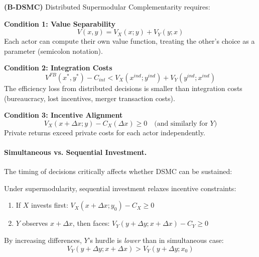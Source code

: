 \begin{axiom}
\label{ax:B-DSMC}
\textbf{(B-DSMC)} Distributed Supermodular Complementarity requires:

\textbf{Condition 1: Value Separability}
\begin{equation}
V(x, y) = V_X(x; y) + V_Y(y; x)
\label{eq:value-sep}
\end{equation}
Each actor can compute their own value function, treating the other's choice 
as a parameter (semicolon notation).

\textbf{Condition 2: Integration Costs}
\begin{equation}
V^{FB}(x^*, y^*) - C_{int} < V_X(x^{ind}; y^{ind}) + V_Y(y^{ind}; x^{ind})
\label{eq:integration-cost}
\end{equation}
The efficiency loss from distributed decisions is smaller than integration costs 
(bureaucracy, lost incentives, merger transaction costs).

\textbf{Condition 3: Incentive Alignment}
\begin{equation}
V_X(x + \Delta x; y) - C_X(\Delta x) \geq 0 \quad \text{(and similarly for } Y\text{)}
\label{eq:incentive-align}
\end{equation}
Private returns exceed private costs for each actor independently.
\end{axiom}

\paragraph{Simultaneous vs. Sequential Investment.}

The timing of decisions critically affects whether DSMC can be sustained:

\begin{proposition}
\label{prop:sequential}
Under supermodularity, sequential investment relaxes incentive constraints:
\begin{enumerate}
    \item If $X$ invests first: $V_X(x + \Delta x; y_0) - C_X \geq 0$
    \item $Y$ observes $x + \Delta x$, then faces: $V_Y(y + \Delta y; x + \Delta x) - C_Y \geq 0$
\end{enumerate}
By increasing differences, $Y$'s hurdle is \emph{lower} than in simultaneous case:
\begin{equation}
V_Y(y + \Delta y; x + \Delta x) > V_Y(y + \Delta y; x_0)
\end{equation}
\end{proposition}

